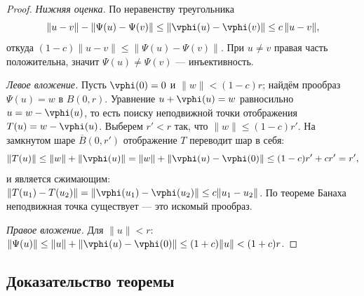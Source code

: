 \begin{proof}
	\emph{Нижняя оценка.} По неравенству треугольника
	\[
	\|u-v\|-\|\Psi(u)-\Psi(v)\|\le\|\vphi(u)-\vphi(v)\|\le c\,\|u-v\|,
	\]
	откуда $(1-c)\|u-v\|\le\|\Psi(u)-\Psi(v)\|$. При $u\ne v$ правая часть положительна,
	значит $\Psi(u)\ne\Psi(v)$ --- инъективность.

	\emph{Левое вложение.} Пусть $\vphi(0)=0$ и $\|w\|<(1-c)r$; найдём прообраз
	$\Psi(u)=w$ в $B(0,r)$. Уравнение $u+\vphi(u)=w$ равносильно
	$u=w-\vphi(u)$, то есть поиску неподвижной точки отображения $T(u)=w-\vphi(u)$.
	Выберем $r'<r$ так, что $\|w\|\le(1-c)r'$. На замкнутом шаре $\overline{B}(0,r')$
	отображение $T$ переводит шар в себя:
	\[
	\|T(u)\|\le\|w\|+\|\vphi(u)\|=\|w\|+\|\vphi(u)-\vphi(0)\|\le(1-c)r'+c r'=r',
	\]
	и является сжимающим: $\|T(u_1)-T(u_2)\|=\|\vphi(u_1)-\vphi(u_2)\|\le c\|u_1-u_2\|$.
	По теореме Банаха неподвижная точка существует --- это искомый прообраз.

	\emph{Правое вложение.} Для $\|u\|<r$:
	$\|\Psi(u)\|\le\|u\|+\|\vphi(u)-\vphi(0)\|\le(1+c)\|u\|<(1+c)r$.
\end{proof}

\subsection*{Доказательство теоремы}

